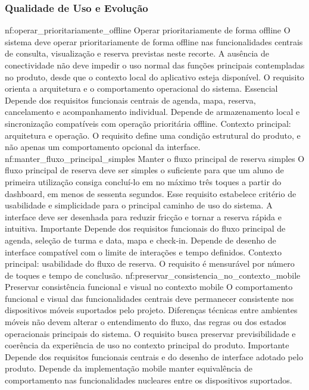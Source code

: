 \subsubsection*{Qualidade de Uso e Evolução}
\reqfuncfull
{nf:operar_prioritariamente_offline}
{Operar prioritariamente de forma offline}
{O sistema deve operar prioritariamente de forma offline nas funcionalidades centrais de consulta, visualização e reserva previstas neste recorte. A ausência de conectividade não deve impedir o uso normal das funções principais contempladas no produto, desde que o contexto local do aplicativo esteja disponível. O requisito orienta a arquitetura e o comportamento operacional do sistema.}
{Essencial}
{Depende dos requisitos funcionais centrais de agenda, mapa, reserva, cancelamento e acompanhamento individual. Depende de armazenamento local e sincronização compatíveis com operação prioritária offline.}
{Contexto principal: arquitetura e operação. O requisito define uma condição estrutural do produto, e não apenas um comportamento opcional da interface.}
\reqfuncfull
{nf:manter_fluxo_principal_simples}
{Manter o fluxo principal de reserva simples}
{O fluxo principal de reserva deve ser simples o suficiente para que um aluno de primeira utilização consiga concluí-lo em no máximo três toques a partir do dashboard, em menos de sessenta segundos. Esse requisito estabelece critério de usabilidade e simplicidade para o principal caminho de uso do sistema. A interface deve ser desenhada para reduzir fricção e tornar a reserva rápida e intuitiva.}
{Importante}
{Depende dos requisitos funcionais do fluxo principal de agenda, seleção de turma e data, mapa e check-in. Depende de desenho de interface compatível com o limite de interações e tempo definidos.}
{Contexto principal: usabilidade do fluxo de reserva. O requisito é mensurável por número de toques e tempo de conclusão.}
\reqfuncfull
{nf:preservar_consistencia_no_contexto_mobile}
{Preservar consistência funcional e visual no contexto mobile}
{O comportamento funcional e visual das funcionalidades centrais deve permanecer consistente nos dispositivos móveis suportados pelo projeto. Diferenças técnicas entre ambientes móveis não devem alterar o entendimento do fluxo, das regras ou dos estados operacionais principais do sistema. O requisito busca preservar previsibilidade e coerência da experiência de uso no contexto principal do produto.}
{Importante}
{Depende dos requisitos funcionais centrais e do desenho de interface adotado pelo produto. Depende da implementação mobile manter equivalência de comportamento nas funcionalidades nucleares entre os dispositivos suportados.}
